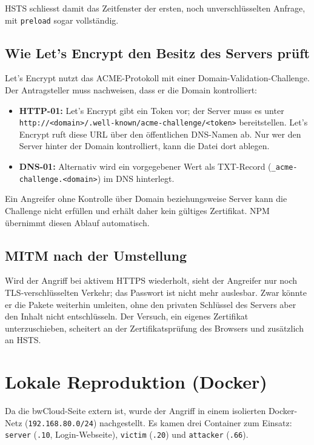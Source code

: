 \documentclass[
	fontsize=12pt,
	paper=a4,
	numbers=noenddot,
	listof=totoc,
	listof=entryprefix,
	listof=nochaptergap,
	bibliography=totoc,
	parskip=half,
	openany
]{scrbook}
\begin{document}
HSTS schliesst damit das Zeitfenster der ersten, noch unverschlüsselten Anfrage,
mit \texttt{preload} sogar vollständig.

\section*{Wie Let's Encrypt den Besitz des Servers prüft}

Let's Encrypt nutzt das ACME-Protokoll mit einer
Domain-Validation-Challenge. Der Antragsteller muss nachweisen, dass er die
Domain kontrolliert:

\begin{itemize}
	\item \textbf{HTTP-01:} Let's Encrypt gibt ein Token vor; der Server muss es
	      unter \texttt{http://<domain>/.well-known/acme-challenge/<token>}
	      bereitstellen. Let's Encrypt ruft diese URL über den öffentlichen
	      DNS-Namen ab. Nur wer den Server hinter der Domain kontrolliert, kann
	      die Datei dort ablegen.
	\item \textbf{DNS-01:} Alternativ wird ein vorgegebener Wert als TXT-Record
	      (\texttt{\_acme-challenge.<domain>}) im DNS hinterlegt.
\end{itemize}

Ein Angreifer ohne Kontrolle über Domain beziehungsweise Server kann die
Challenge nicht erfüllen und erhält daher kein gültiges Zertifikat. NPM übernimmt
diesen Ablauf automatisch.

\section*{MITM nach der Umstellung}

Wird der Angriff bei aktivem HTTPS wiederholt, sieht der Angreifer nur noch
TLS-verschlüsselten Verkehr; das Passwort ist nicht mehr auslesbar. Zwar könnte
er die Pakete weiterhin umleiten, ohne den privaten Schlüssel des Servers aber
den Inhalt nicht entschlüsseln. Der Versuch, ein eigenes Zertifikat
unterzuschieben, scheitert an der Zertifikatsprüfung des Browsers und zusätzlich
an HSTS.

\chapter*{Lokale Reproduktion (Docker)}

Da die bwCloud-Seite extern ist, wurde der Angriff in einem isolierten
Docker-Netz (\texttt{192.168.80.0/24}) nachgestellt. Es kamen drei Container zum
Einsatz: \texttt{server} (\texttt{.10}, Login-Webseite), \texttt{victim}
(\texttt{.20}) und \texttt{attacker} (\texttt{.66}).
\end{document}
